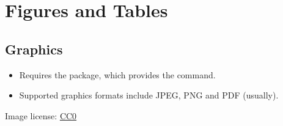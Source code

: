 \documentclass[aspectratio=169]{beamer}
\begin{document}
\section{Figures and Tables}


\subsection{Graphics}
\begin{frame}[fragile]{\insertsubsection}
\begin{itemize}
\item Requires the  package, which provides the
 command.
\item Supported graphics formats include JPEG, PNG and PDF (usually).
\end{itemize}

\tiny{Image license: \href{https://pixabay.com/en/animal-apple-attractive-beautiful-1239390/}{CC0}}
\end{frame}
\end{document}
